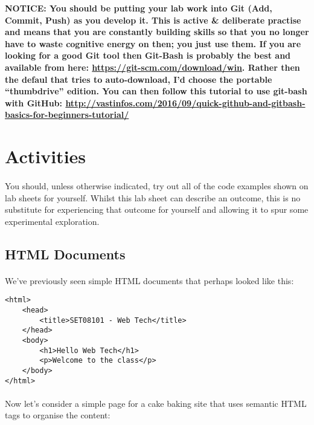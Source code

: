 \documentclass[10pt, a4paper]{article}
\begin{document}
\begin{framed}
{\bf{NOTICE:} You should be putting your lab work into Git (Add, Commit, Push) as you develop it. This is active \& deliberate practise and means that you are constantly building skills so that you no longer have to waste cognitive energy on then; you just use them. If you are looking for a good Git tool then Git-Bash is probably the best and available from here: \url{https://git-scm.com/download/win}. Rather then the defaul that tries to auto-download, I'd choose the portable ``thumbdrive'' edition. You can then follow this tutorial to use git-bash with GitHub: \url{http://vastinfos.com/2016/09/quick-github-and-gitbash-basics-for-beginners-tutorial/} }
\end{framed}


\section{Activities}

\paragraph{} You should, unless otherwise indicated, try out all of the code examples shown on lab sheets for yourself. Whilst this lab sheet can describe an outcome, this is no substitute for experiencing that outcome for yourself and allowing it to spur some experimental exploration.

\subsection{HTML Documents}
\paragraph{} We've previously seen simple HTML documents that perhaps looked like this:

\begin{lstlisting}
<html>
    <head>
        <title>SET08101 - Web Tech</title>
    </head>
    <body>
        <h1>Hello Web Tech</h1>
        <p>Welcome to the class</p>
    </body>
</html>
\end{lstlisting}

\paragraph{} Now let's consider a simple page for a cake baking site that uses semantic HTML tags to organise the content:
\end{document}

